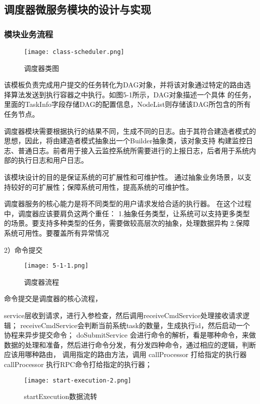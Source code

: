 \subsection{调度器微服务模块的设计与实现}


\subsubsection{模块业务流程}

\begin{figure}[H]
    \centering
    \texttt{[image: class-scheduler.png]}
    \caption{调度器类图}
    \label{fig:ddqlt}
\end{figure}
该模板负责完成用户提交的任务转化为DAG对象，并将该对象通过特定的路由选择算法发送到执行容器之中执行。如图5-1所示，DAG对象描述一个具体
的任务，里面的TaskInfo字段存储DAG的配置信息，NodeList则存储该DAG所包含的所有任务节点。

调度器模块需要根据执行的结果不同，生成不同的日志。由于其符合建造者模式的思想，因此，将由建造者模式抽象出一个Builder抽象类，该对象支持
构建监控日志、普通日志。前者用于接入云监控系统所需要进行的上报日志，后者用于系统内部的执行日志和用户日志。


该模块设计的目的是保证系统的可扩展性和可维护性。 通过抽象业务场景，以支持较好的可扩展性；保障系统可用性，提高系统的可维护性。

调度器服务的核心能力是将不同类型的用户请求发给合适的执行器。 在这个过程中，调度器应该要肩负这两个重任：
1.抽象任务类型，让系统可以支持更多类型的场景。要支持多种类型的任务，需要做较高层次的抽象，处理数据异构
2.保障系统可用性。要覆盖所有异常情况

2）命令提交

\begin{figure}[H]
    \centering
    \texttt{[image: 5-1-1.png]}
    \caption{调度器流程}
    \label{fig:调度器流程}
\end{figure}

命令提交是调度器的核心流程，

service层收到请求，进行入参检查，然后调用receiveCmdService处理接收请求逻辑；
receiveCmdService会判断当前系统task的数量，生成执行id，然后启动一个协程来异步提交命令；
doSubmitService 会进行命令的解析，看是哪种命令，来做数据的处理和准备，然后进行命令分发，有分发四种命令，通过相应的逻辑，判断应该用哪种路由，
调用指定的路由方法，调用 callProcessor 打给指定的执行器
callProcessor 执行RPC命令打给指定的执行器；


\begin{figure}[H]
    \centering
    \texttt{[image: start-execution-2.png]}
    \caption{startExecution数据流转}
    \label{fig:startExecution数据流转}
    \note{}
\end{figure}

